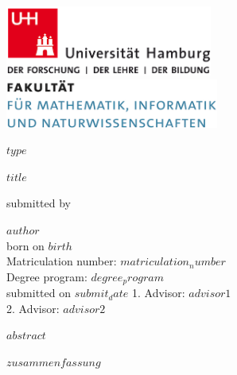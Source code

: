 \documentclass[a4paper,12pt]{article}
\begin{document}
\thispagestyle{empty}

\begin{titlepage}

\includegraphics[width=6.8cm]{images/uhh_logo.png}
\hspace{2cm}
\includegraphics[width=7cm]{images/min_logo.png}

\begin{center}\Large
  \vfill
	$type$
	\vfill
	\makeatletter
	{\LARGE\textsf{\textbf{$title$}}\par}
	\makeatother
	\vfill
  submitted by \\\vspace{0.5cm}
  \par\bigskip
	\makeatletter
  \textbf{$author$} \\
  \makeatother
  born on $birth$ \\
  Matriculation number: $matriculation_number$ \\
  Degree program: $degree_program$ \\
  \vfill
	\makeatletter
	submitted on $submit_date$
	\makeatother
	\vfill
  1. Advisor: $advisor1$ \\
  2. Advisor: $advisor2$ \\

\end{center}
\end{titlepage}


\newpage
$abstract$
\pagestyle{plain}
\setcounter{page}{1}    				%

\newpage
$zusammenfassung$

\newpage
\renewcommand{\contentsname}{Table of Content}
\tableofcontents
\clearpage
\end{document}
